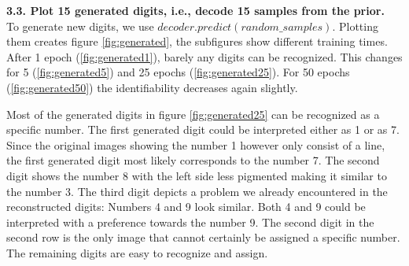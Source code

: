 \textbf{3.3. Plot 15 generated digits, i.e., decode 15 samples from the prior.} \\

To generate new digits, we use \texttt{$decoder.predict(random\_samples)$}. Plotting them creates figure \ref{fig:generated}, the subfigures show different training times. After 1 epoch (\ref{fig:generated1}), barely any digits can be recognized. This changes for 5 (\ref{fig:generated5}) and 25 epochs (\ref{fig:generated25}).  For 50 epochs (\ref{fig:generated50}) the identifiability decreases again slightly. 

Most of the generated digits in figure \ref{fig:generated25} can be recognized as a specific number. The first generated digit could be interpreted either as 1 or as 7. Since the original images showing the number 1 however only consist of a line, the first generated digit most likely corresponds to the number 7. The second digit shows the number 8 with the left side less pigmented making it similar to the number 3. The third digit depicts a problem we already encountered in the reconstructed digits: Numbers 4 and 9 look similar. Both 4 and 9 could be interpreted with a preference towards the number 9. The second digit in the second row is the only image that cannot certainly be assigned a specific number. The remaining digits are easy to recognize and assign. \\

